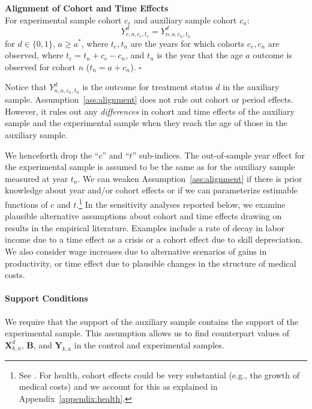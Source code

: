 \onehalfspacing
\begin{assumption}\label{ass:alignment} \textbf{Alignment of Cohort and Time Effects}\\
For experimental sample cohort $c_{e}$ and auxiliary sample cohort $c_{n}$:
\begin{equation}
Y_{e,a,c_{e},t_{e}}^d = Y_{n,a,c_{n},t_{n}}^d
\end{equation}
for $d \in \{ 0, 1\}$, $a \geq a^*$, where $t_{e}, t_{n}$ are the years for which cohorts $c_{e}, c_{n}$ are observed, where $t_e = t_n + c_e - c_n$, and $t_n$ is the year that the age $a$ outcome is observed for cohort $n$ ($t_n = a + c_n$). $\square$
\end{assumption}
\doublespacing

\noindent Notice that $Y^d_{n,a,{c_n},{t_n}}$ is the outcome for treatment status $d$ in the auxiliary sample. Assumption~\ref{ass:alignment} does not rule out cohort or period effects. However, it rules out any \emph{differences} in cohort and time effects of the auxiliary sample and the experimental sample when they reach the age of those in the auxiliary sample.

\noindent We henceforth drop the ``$c$'' and ``$t$'' sub-indices. The out-of-sample year effect for the experimental sample is assumed to be the same as for the auxiliary sample measured at year $t_n$. We can weaken Assumption~\ref{ass:alignment} if there is prior knowledge about year and/or cohort effects or if we can parameterize estimable functions of $c$ and $t$.\footnote{See \cite{Heckman_Robb_1985_JE}. For health, cohort effects could be very substantial (e.g., the growth of medical costs) and we account for this as explained in Appendix~\ref{appendix:health}.} In the sensitivity analyses reported below, we examine plausible alternative assumptions about cohort and time effects drawing on results in the empirical literature. Examples include a rate of decay in labor income due to a time effect as a crisis or a cohort effect due to skill depreciation. We also consider wage increases due to alternative scenarios of gains in productivity, or time effect due to plausible changes in the structure of medical costs.

\paragraph{Support Conditions}

\noindent  We require that the support of the auxiliary sample contains the support of the experimental sample. This assumption allows us to find counterpart values of $\bm{X}^d_{k,a}$, $\bm{B}$, and $\bm{Y}_{k,a}$ in the control and experimental samples.

